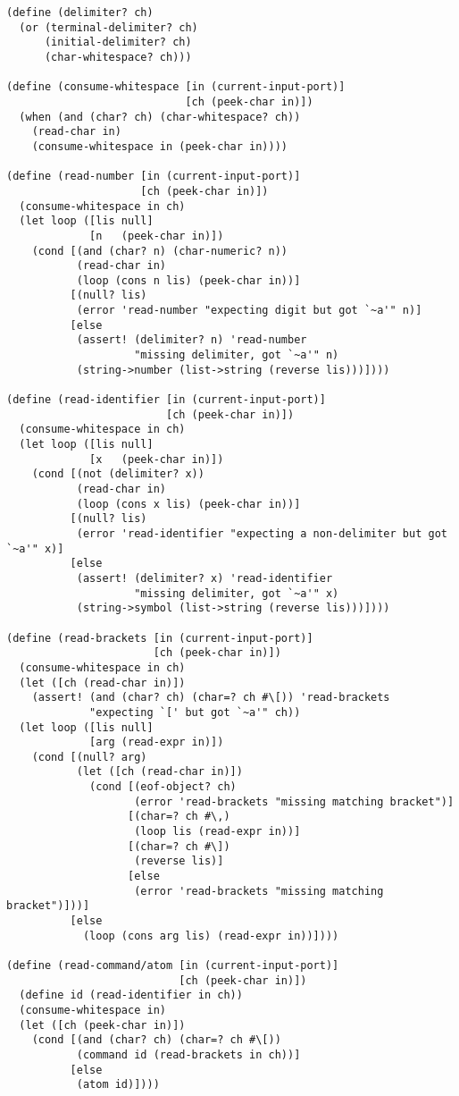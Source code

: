 \begin{lstlisting}[language=racket]
(define (delimiter? ch)
  (or (terminal-delimiter? ch)
      (initial-delimiter? ch)
      (char-whitespace? ch)))

(define (consume-whitespace [in (current-input-port)]
                            [ch (peek-char in)])
  (when (and (char? ch) (char-whitespace? ch))
    (read-char in)
    (consume-whitespace in (peek-char in))))

(define (read-number [in (current-input-port)]
                     [ch (peek-char in)])
  (consume-whitespace in ch)
  (let loop ([lis null]
             [n   (peek-char in)])
    (cond [(and (char? n) (char-numeric? n))
           (read-char in)
           (loop (cons n lis) (peek-char in))]
          [(null? lis)
           (error 'read-number "expecting digit but got `~a'" n)]
          [else
           (assert! (delimiter? n) 'read-number
                    "missing delimiter, got `~a'" n)
           (string->number (list->string (reverse lis)))])))

(define (read-identifier [in (current-input-port)]
                         [ch (peek-char in)])
  (consume-whitespace in ch)
  (let loop ([lis null]
             [x   (peek-char in)])
    (cond [(not (delimiter? x))
           (read-char in)
           (loop (cons x lis) (peek-char in))]
          [(null? lis)
           (error 'read-identifier "expecting a non-delimiter but got `~a'" x)]
          [else
           (assert! (delimiter? x) 'read-identifier
                    "missing delimiter, got `~a'" x)
           (string->symbol (list->string (reverse lis)))])))

(define (read-brackets [in (current-input-port)]
                       [ch (peek-char in)])
  (consume-whitespace in ch)
  (let ([ch (read-char in)])
    (assert! (and (char? ch) (char=? ch #\[)) 'read-brackets
             "expecting `[' but got `~a'" ch))
  (let loop ([lis null]
             [arg (read-expr in)])
    (cond [(null? arg)
           (let ([ch (read-char in)])
             (cond [(eof-object? ch)
                    (error 'read-brackets "missing matching bracket")]
                   [(char=? ch #\,)
                    (loop lis (read-expr in))]
                   [(char=? ch #\])
                    (reverse lis)]
                   [else
                    (error 'read-brackets "missing matching bracket")]))]
          [else
            (loop (cons arg lis) (read-expr in))])))

(define (read-command/atom [in (current-input-port)]
                           [ch (peek-char in)])
  (define id (read-identifier in ch))
  (consume-whitespace in)
  (let ([ch (peek-char in)])
    (cond [(and (char? ch) (char=? ch #\[))
           (command id (read-brackets in ch))]
          [else
           (atom id)])))


\end{lstlisting}
